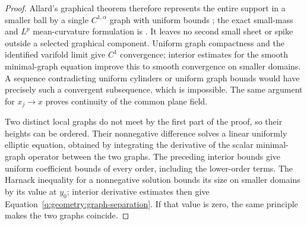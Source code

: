 \begin{proof}
Allard's graphical theorem therefore represents the entire support
in a smaller ball by a single $C^{1,\alpha}$ graph with uniform bounds
\cite{Allard1972,Maggi2012}; the exact small-mass and $L^p$ mean-curvature
formulation is \cite[Chapter~5, Section~5, Theorem~5.2]{Simon2014}.
It leaves no second small sheet or spike outside a selected graphical
component. Uniform graph compactness and the identified varifold
limit give $C^1$ convergence; interior estimates for the smooth
minimal-graph equation improve this to smooth convergence on smaller
domains. A sequence contradicting uniform cylinders or uniform graph
bounds would have precisely such a convergent subsequence, which is
impossible. The same argument for $x_j\to x$ proves continuity of
the common plane field.

Two distinct local graphs do not meet by the first part of the proof,
so their heights can be ordered. Their nonnegative difference solves
a linear uniformly elliptic equation, obtained by integrating the
derivative of the scalar minimal-graph operator between the two
graphs. The preceding interior bounds give uniform coefficient bounds
of every order, including the lower-order terms. The Harnack
inequality for a nonnegative solution bounds its size on smaller
domains by its value at $y_0$; interior derivative estimates then give
Equation~\eqref{q:geometry:graph-separation}. If that value is zero,
the same principle makes the two graphs coincide.
\end{proof}
